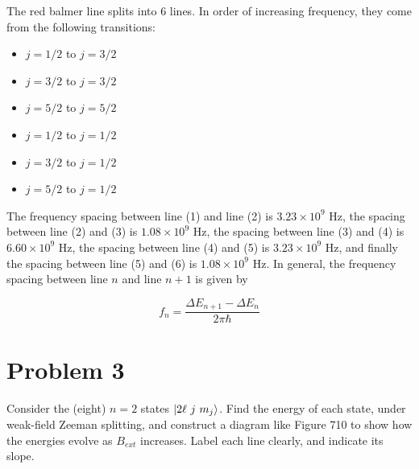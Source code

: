\documentclass[10pt]{article}
\begin{document}
\begin{solution}
			The red balmer line splits into 6 lines. In order of increasing frequency, they come from the following transitions: 

			\begin{itemize}
				\item $j = 1/2$ to $j = 3/2$
				\item $j = 3/2$ to $j = 3/2$
				\item $j = 5/2$ to $j = 5/2$
				\item $j = 1/2$ to $j = 1/2$
				\item $j = 3/2$ to $j = 1/2$
				\item $j = 5/2$ to $j = 1/2$
			\end{itemize}

			The frequency spacing between line (1) and line (2) is $3.23 \times 10^{9}$ Hz, the spacing between line (2) and (3) is $1.08 \times 10^{9}$ Hz, the spacing between line (3) and (4) is $6.60 \times 10^{9}$ Hz, the spacing between line (4) and (5) is $3.23 \times 10^{9}$ Hz, and finally the spacing between line (5) and (6) is $1.08 \times 10^{9}$ Hz. In general, the frequency spacing between line $n$ and line $n+1$ is given by 

			\[ f_n = \frac{\Delta E_{n+1} - \Delta E_n}{2\pi \hbar}\]
		\end{solution}
		\pagebreak

		\section*{Problem 3}
		Consider the (eight) $n=2$ states $\ket{2\ell \ j \ m_j}$. Find the energy of each state, under
		weak-field Zeeman splitting, and construct a diagram like Figure 710 to show how the energies
		evolve as $B_{ext}$ increases. Label each line clearly, and indicate its slope. 
\end{document}

